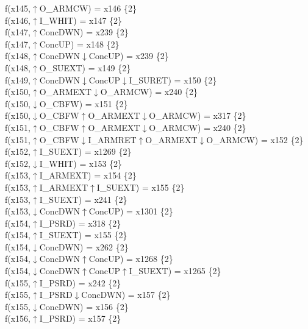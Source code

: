 f(x145,$\uparrow$O\_ARMCW) = x146 \{2\} \\  
f(x146,$\uparrow$I\_WHIT) = x147 \{2\} \\  
f(x147,$\uparrow$ConcDWN) = x239 \{2\} \\  
f(x147,$\uparrow$ConcUP) = x148 \{2\} \\  
f(x148,$\uparrow$ConcDWN$\downarrow$ConcUP) = x239 \{2\} \\  
f(x148,$\uparrow$O\_SUEXT) = x149 \{2\} \\  
f(x149,$\uparrow$ConcDWN$\downarrow$ConcUP$\downarrow$I\_SURET) = x150 \{2\} \\  
f(x150,$\uparrow$O\_ARMEXT$\downarrow$O\_ARMCW) = x240 \{2\} \\  
f(x150,$\downarrow$O\_CBFW) = x151 \{2\} \\  
f(x150,$\downarrow$O\_CBFW$\uparrow$O\_ARMEXT$\downarrow$O\_ARMCW) = x317 \{2\} \\  
f(x151,$\uparrow$O\_CBFW$\uparrow$O\_ARMEXT$\downarrow$O\_ARMCW) = x240 \{2\} \\  
f(x151,$\uparrow$O\_CBFW$\downarrow$I\_ARMRET$\uparrow$O\_ARMEXT$\downarrow$O\_ARMCW) = x152 \{2\} \\  
f(x152,$\uparrow$I\_SUEXT) = x1269 \{2\} \\  
f(x152,$\downarrow$I\_WHIT) = x153 \{2\} \\  
f(x153,$\uparrow$I\_ARMEXT) = x154 \{2\} \\  
f(x153,$\uparrow$I\_ARMEXT$\uparrow$I\_SUEXT) = x155 \{2\} \\  
f(x153,$\uparrow$I\_SUEXT) = x241 \{2\} \\  
f(x153,$\downarrow$ConcDWN$\uparrow$ConcUP) = x1301 \{2\} \\  
f(x154,$\uparrow$I\_PSRD) = x318 \{2\} \\  
f(x154,$\uparrow$I\_SUEXT) = x155 \{2\} \\  
f(x154,$\downarrow$ConcDWN) = x262 \{2\} \\  
f(x154,$\downarrow$ConcDWN$\uparrow$ConcUP) = x1268 \{2\} \\  
f(x154,$\downarrow$ConcDWN$\uparrow$ConcUP$\uparrow$I\_SUEXT) = x1265 \{2\} \\  
f(x155,$\uparrow$I\_PSRD) = x242 \{2\} \\  
f(x155,$\uparrow$I\_PSRD$\downarrow$ConcDWN) = x157 \{2\} \\  
f(x155,$\downarrow$ConcDWN) = x156 \{2\} \\  
f(x156,$\uparrow$I\_PSRD) = x157 \{2\} \\  

